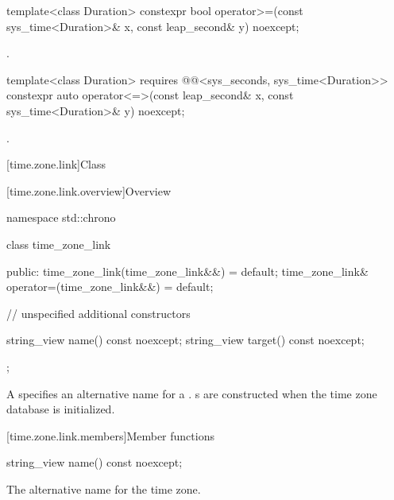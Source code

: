 %
%
\begin{itemdecl}
template<class Duration>
  constexpr bool operator>=(const sys_time<Duration>& x, const leap_second& y) noexcept;
\end{itemdecl}

\begin{itemdescr}
\pnum
\returns
{}.
\end{itemdescr}

%
%
\begin{itemdecl}
template<class Duration>
  requires @@<sys_seconds, sys_time<Duration>>
  constexpr auto operator<=>(const leap_second& x, const sys_time<Duration>& y) noexcept;
\end{itemdecl}

\begin{itemdescr}
\pnum
\returns
{}.
\end{itemdescr}

[time.zone.link]{Class }

[time.zone.link.overview]{Overview}

\begin{codeblock}
namespace std::chrono {
  class time_zone_link {
  public:
    time_zone_link(time_zone_link&&)            = default;
    time_zone_link& operator=(time_zone_link&&) = default;

    // unspecified additional constructors

    string_view name()   const noexcept;
    string_view target() const noexcept;
  };
}
\end{codeblock}

\pnum
A  specifies an alternative name for a .
s are constructed when the time zone database is initialized.

[time.zone.link.members]{Member functions}

%
\begin{itemdecl}
string_view name() const noexcept;
\end{itemdecl}

\begin{itemdescr}
\pnum
\returns
The alternative name for the time zone.
\end{itemdescr}

